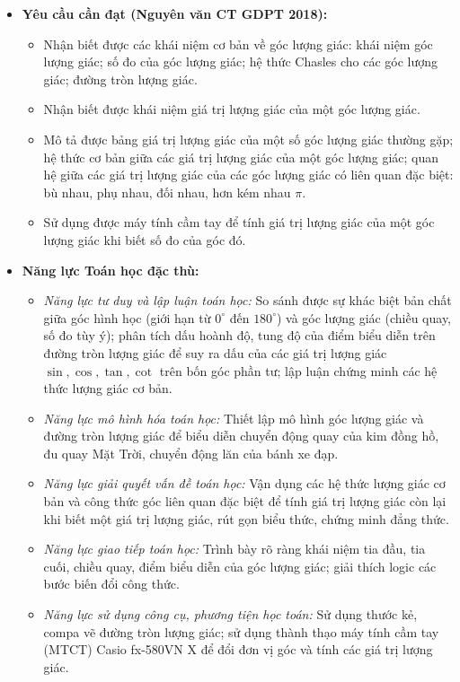 \documentclass[12pt, a4paper]{article}
\begin{document}
\begin{itemize}[leftmargin=1.2cm]
    \item \textbf{Yêu cầu cần đạt (Nguyên văn CT GDPT 2018):}
    \begin{itemize}[leftmargin=0.6cm]
        \item Nhận biết được các khái niệm cơ bản về góc lượng giác: khái niệm góc lượng giác; số đo của góc lượng giác; hệ thức Chasles cho các góc lượng giác; đường tròn lượng giác.
        \item Nhận biết được khái niệm giá trị lượng giác của một góc lượng giác.
        \item Mô tả được bảng giá trị lượng giác của một số góc lượng giác thường gặp; hệ thức cơ bản giữa các giá trị lượng giác của một góc lượng giác; quan hệ giữa các giá trị lượng giác của các góc lượng giác có liên quan đặc biệt: bù nhau, phụ nhau, đối nhau, hơn kém nhau $\pi$.
        \item Sử dụng được máy tính cầm tay để tính giá trị lượng giác của một góc lượng giác khi biết số đo của góc đó.
    \end{itemize}

    \item \textbf{Năng lực Toán học đặc thù:}
    \begin{itemize}[leftmargin=0.6cm]
        \item \textit{Năng lực tư duy và lập luận toán học:} So sánh được sự khác biệt bản chất giữa góc hình học (giới hạn từ $0^\circ$ đến $180^\circ$) và góc lượng giác (chiều quay, số đo tùy ý); phân tích dấu hoành độ, tung độ của điểm biểu diễn trên đường tròn lượng giác để suy ra dấu của các giá trị lượng giác $\sin, \cos, \tan, \cot$ trên bốn góc phần tư; lập luận chứng minh các hệ thức lượng giác cơ bản.
        \item \textit{Năng lực mô hình hóa toán học:} Thiết lập mô hình góc lượng giác và đường tròn lượng giác để biểu diễn chuyển động quay của kim đồng hồ, đu quay Mặt Trời, chuyển động lăn của bánh xe đạp.
        \item \textit{Năng lực giải quyết vấn đề toán học:} Vận dụng các hệ thức lượng giác cơ bản và công thức góc liên quan đặc biệt để tính giá trị lượng giác còn lại khi biết một giá trị lượng giác, rút gọn biểu thức, chứng minh đẳng thức.
        \item \textit{Năng lực giao tiếp toán học:} Trình bày rõ ràng khái niệm tia đầu, tia cuối, chiều quay, điểm biểu diễn của góc lượng giác; giải thích logic các bước biến đổi công thức.
        \item \textit{Năng lực sử dụng công cụ, phương tiện học toán:} Sử dụng thước kẻ, compa vẽ đường tròn lượng giác; sử dụng thành thạo máy tính cầm tay (MTCT) Casio fx-580VN X để đổi đơn vị góc và tính các giá trị lượng giác.
    \end{itemize}


\end{itemize}
\end{document}
